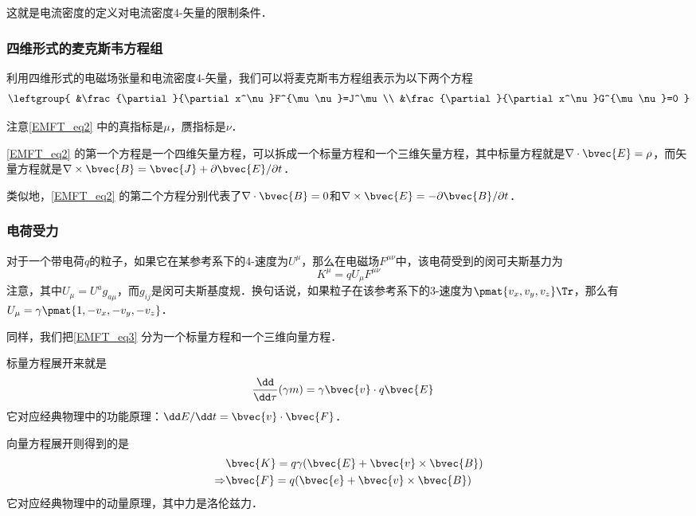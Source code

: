 这就是电流密度的定义对电流密度4-矢量的限制条件．


\subsubsection{四维形式的麦克斯韦方程组}

利用四维形式的电磁场张量和电流密度4-矢量，我们可以将麦克斯韦方程组表示为以下两个方程
\begin{equation}\label{EMFT_eq2}
\leftgroup{
    &\frac{\partial}{\partial x^\nu}F^{\mu\nu}=J^\mu\\
    &\frac{\partial}{\partial x^\nu}G^{\mu\nu}=0
}
\end{equation}

注意\autoref{EMFT_eq2} 中的真指标是$\mu$，赝指标是$\nu$．

\autoref{EMFT_eq2} 的第一个方程是一个四维矢量方程，可以拆成一个标量方程和一个三维矢量方程，其中标量方程就是$\nabla\cdot\bvec{E}=\rho$，而矢量方程就是$\nabla\times\bvec{B}=\bvec{J}+\partial\bvec{E}/\partial t$． 

类似地，\autoref{EMFT_eq2} 的第二个方程分别代表了$\nabla\cdot\bvec{B}=0$和$\nabla\times\bvec{E}=-\partial\bvec{B}/\partial t$．

\subsubsection{电荷受力}

对于一个带电荷$q$的粒子，如果它在某参考系下的4-速度为$U^\mu$，那么在电磁场$F^{\mu\nu}$中，该电荷受到的闵可夫斯基力为
\begin{equation}\label{EMFT_eq3}
K^{\mu}=qU_\mu F^{\mu\nu}
\end{equation}
注意，其中$U_\mu=U^ag_{a\mu}$，而$g_{ij}$是闵可夫斯基度规．换句话说，如果粒子在该参考系下的3-速度为$\pmat{v_x, v_y, v_z}\Tr$，那么有$U_\mu=\gamma\pmat{1, -v_x, -v_y, -v_z}$．

同样，我们把\autoref{EMFT_eq3} 分为一个标量方程和一个三维向量方程．

标量方程展开来就是
\begin{equation}
\begin{aligned}
&\frac{\dd}{\dd\tau}(\gamma m)=\gamma \bvec{v}\cdot q\bvec{E}
\end{aligned}
\end{equation}
它对应经典物理中的功能原理：$\dd E/\dd t=\bvec{v}\cdot\bvec{F}$．

向量方程展开则得到的是
\begin{equation}
\begin{aligned}
&\bvec{K}=q\gamma(\bvec{E}+\bvec{v}\times\bvec{B})\\
\Rightarrow &\bvec{F}=q(\bvec{e}+\bvec{v}\times\bvec{B})
\end{aligned}
\end{equation}
它对应经典物理中的动量原理，其中力是洛伦兹力．






